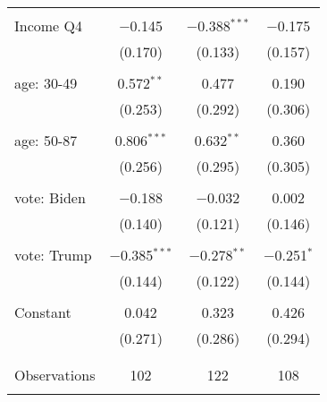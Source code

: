 \begin{tabular}{@{\extracolsep{5pt}}lccc}
  & & & \\ 
 Income Q4 & $-$0.145 & $-$0.388$^{***}$ & $-$0.175 \\ 
  & (0.170) & (0.133) & (0.157) \\ 
  & & & \\ 
 age: 30-49 & 0.572$^{**}$ & 0.477 & 0.190 \\ 
  & (0.253) & (0.292) & (0.306) \\ 
  & & & \\ 
 age: 50-87 & 0.806$^{***}$ & 0.632$^{**}$ & 0.360 \\ 
  & (0.256) & (0.295) & (0.305) \\ 
  & & & \\ 
 vote: Biden & $-$0.188 & $-$0.032 & 0.002 \\ 
  & (0.140) & (0.121) & (0.146) \\ 
  & & & \\ 
 vote: Trump & $-$0.385$^{***}$ & $-$0.278$^{**}$ & $-$0.251$^{*}$ \\ 
  & (0.144) & (0.122) & (0.144) \\ 
  & & & \\ 
 Constant & 0.042 & 0.323 & 0.426 \\ 
  & (0.271) & (0.286) & (0.294) \\ 
  & & & \\ 
\hline \\[-1.8ex] 

Observations & 102 & 122 & 108 \\ 
\hline 
\hline \\[-1.8ex] 
\end{tabular} 